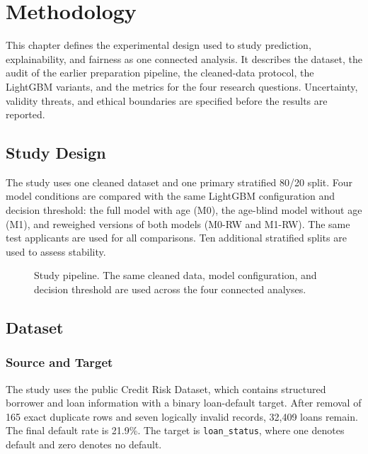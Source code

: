 \chapter{Methodology}
\label{chap:methodology}

This chapter defines the experimental design used to study prediction,
explainability, and fairness as one connected analysis. It describes the
dataset, the audit of the earlier preparation pipeline, the cleaned-data
protocol, the LightGBM variants, and the metrics for the four research
questions. Uncertainty, validity threats, and ethical boundaries are specified
before the results are reported.

\section{Study Design}
\label{sec:study-design}

The study uses one cleaned dataset and one primary stratified 80/20 split.
Four model conditions are compared with the same LightGBM configuration and
decision threshold: the full model with age (M0), the age-blind model without
age (M1), and reweighed versions of both models (M0-RW and M1-RW). The same
test applicants are used for all comparisons. Ten additional stratified splits
are used to assess stability.

\begin{figure}[H]
  \centering
  \caption{Study pipeline. The same cleaned data, model configuration, and
  decision threshold are used across the four connected analyses.}
  \label{fig:study-pipeline}
\end{figure}

\section{Dataset}
\label{sec:dataset}

\subsection{Source and Target}

The study uses the public Credit Risk Dataset, which contains structured
borrower and loan information with a binary loan-default target. After removal
of 165 exact duplicate rows and seven logically invalid records, 32,409 loans
remain. The final default rate is 21.9\%. The target is \texttt{loan\_status},
where one denotes default and zero denotes no default.

